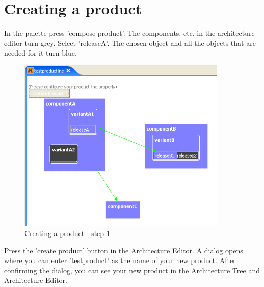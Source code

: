 \section{Creating a product}

In the palette press 'compose product'. The components, etc. in the architecture editor turn
grey. Select 'releaseA'. The chosen object and all the objects that are needed for it turn blue. 

\begin{figure}[h!]
\begin{center}
\includegraphics[width=10cm]{tutorial14.png}
   \caption{Creating a product - step 1}
\end{center}
\end{figure}\par


Press the 
'create product' button in the Architecture Editor. A dialog opens where you can enter 'testproduct' as
the name of your new product. After confirming the dialog, you can see
your new product in the Architecture Tree and Architecture Editor.

